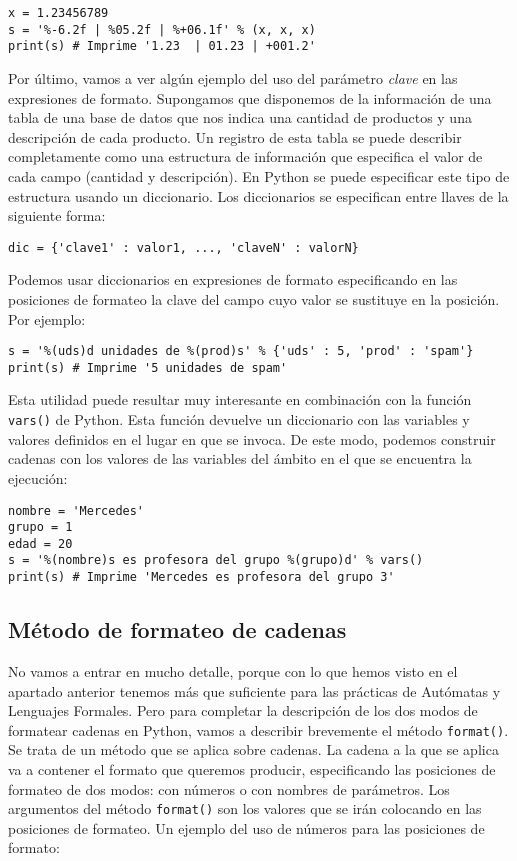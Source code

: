 \begin{lstlisting}
x = 1.23456789
s = '%-6.2f | %05.2f | %+06.1f' % (x, x, x)
print(s) # Imprime '1.23  | 01.23 | +001.2'
\end{lstlisting}

Por último, vamos a ver algún ejemplo del uso del parámetro \emph{clave} en las expresiones de formato. Supongamos que disponemos de la información de una tabla de una base de datos que nos indica una cantidad de productos y una descripción de cada producto. Un registro de esta tabla se puede describir completamente como una estructura de información que especifica el valor de cada campo (cantidad y descripción). En Python se puede especificar este tipo de estructura usando un diccionario. Los diccionarios se especifican entre llaves de la siguiente forma:

\begin{lstlisting}
dic = {'clave1' : valor1, ..., 'claveN' : valorN}
\end{lstlisting}

Podemos usar diccionarios en expresiones de formato especificando en las posiciones de formateo la clave del campo cuyo valor se sustituye en la posición. Por ejemplo:

\begin{lstlisting}
s = '%(uds)d unidades de %(prod)s' % {'uds' : 5, 'prod' : 'spam'}
print(s) # Imprime '5 unidades de spam'
\end{lstlisting}

Esta utilidad puede resultar muy interesante en combinación con la función \texttt{vars()} de Python. Esta función devuelve un diccionario con las variables y valores definidos en el lugar en que se invoca. De este modo, podemos construir cadenas con los valores de las variables del ámbito en el que se encuentra la ejecución:

\begin{lstlisting}
nombre = 'Mercedes'
grupo = 1
edad = 20
s = '%(nombre)s es profesora del grupo %(grupo)d' % vars()
print(s) # Imprime 'Mercedes es profesora del grupo 3'
\end{lstlisting}

\subsection{Método de formateo de cadenas}

No vamos a entrar en mucho detalle, porque con lo que hemos visto en el apartado anterior tenemos más que suficiente para las prácticas de Autómatas y Lenguajes Formales. Pero para completar la descripción de los dos modos de formatear cadenas en Python, vamos a describir brevemente el método \texttt{format()}. Se trata de un método que se aplica sobre cadenas. La cadena a la que se aplica va a contener el formato que queremos producir, especificando las posiciones de formateo de dos modos: con números o con nombres de parámetros. Los argumentos del método \texttt{format()} son los valores que se irán colocando en las posiciones de formateo. Un ejemplo del uso de números para las posiciones de formato:

